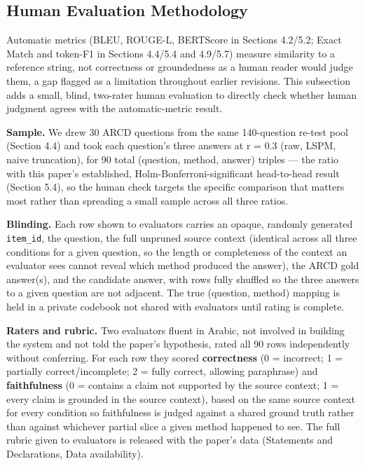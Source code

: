 \subsection{Human Evaluation Methodology}
Automatic metrics (BLEU, ROUGE-L, BERTScore in Sections 4.2/5.2; Exact Match and token-F1 in Sections 4.4/5.4 and 4.9/5.7) measure similarity to a reference string, not correctness or groundedness as a human reader would judge them, a gap flagged as a limitation throughout earlier revisions. This subsection adds a small, blind, two-rater human evaluation to directly check whether human judgment agrees with the automatic-metric result.

\textbf{Sample.} We drew 30 ARCD questions from the same 140-question re-test pool (Section 4.4) and took each question's three answers at r = 0.3 (raw, LSPM, naive truncation), for 90 total (question, method, answer) triples --- the ratio with this paper's established, Holm-Bonferroni-significant head-to-head result (Section 5.4), so the human check targets the specific comparison that matters most rather than spreading a small sample across all three ratios.

\textbf{Blinding.} Each row shown to evaluators carries an opaque, randomly generated \texttt{item\_id}, the question, the full unpruned source context (identical across all three conditions for a given question, so the length or completeness of the context an evaluator sees cannot reveal which method produced the answer), the ARCD gold answer(s), and the candidate answer, with rows fully shuffled so the three answers to a given question are not adjacent. The true (question, method) mapping is held in a private codebook not shared with evaluators until rating is complete.

\textbf{Raters and rubric.} Two evaluators fluent in Arabic, not involved in building the system and not told the paper's hypothesis, rated all 90 rows independently without conferring. For each row they scored \textbf{correctness} (0 = incorrect; 1 = partially correct/incomplete; 2 = fully correct, allowing paraphrase) and \textbf{faithfulness} (0 = contains a claim not supported by the source context; 1 = every claim is grounded in the source context), based on the same source context for every condition so faithfulness is judged against a shared ground truth rather than against whichever partial slice a given method happened to see. The full rubric given to evaluators is released with the paper's data (Statements and Declarations, Data availability).

